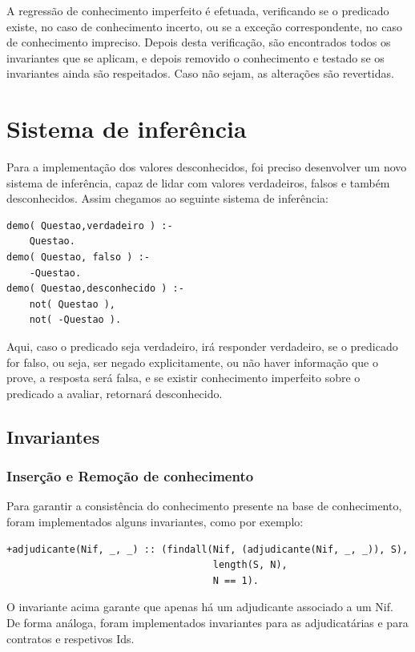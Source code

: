 \documentclass[a4paper]{report}
\begin{document}
A regressão de conhecimento imperfeito é efetuada, verificando se o predicado
existe, no caso de conhecimento incerto, ou se a exceção correspondente, no caso
de conhecimento impreciso. Depois desta verificação, são encontrados todos os
invariantes que se aplicam, e depois removido o conhecimento e testado se os
invariantes ainda são respeitados. Caso não sejam, as alterações são revertidas.

\chapter{Sistema de inferência}

Para a implementação dos valores desconhecidos, foi preciso desenvolver um novo
sistema de inferência, capaz de lidar com valores verdadeiros, falsos e também
desconhecidos. Assim chegamos ao seguinte sistema de inferência: 

\begin{verbatim}
demo( Questao,verdadeiro ) :-
    Questao.
demo( Questao, falso ) :-
    -Questao.
demo( Questao,desconhecido ) :-
    not( Questao ),
    not( -Questao ).
\end{verbatim}

Aqui, caso o predicado seja verdadeiro, irá responder verdadeiro, se o predicado
for falso, ou seja, ser negado explicitamente, ou não haver informação que o
prove, a resposta será falsa, e se existir conhecimento imperfeito sobre o
predicado a avaliar, retornará desconhecido.

\section{Invariantes}

\subsection{Inserção e Remoção de conhecimento}

Para garantir a consistência do conhecimento presente na base de conhecimento,
foram implementados alguns invariantes, como por exemplo:

\begin{verbatim}
+adjudicante(Nif, _, _) :: (findall(Nif, (adjudicante(Nif, _, _)), S),
                                    length(S, N),
                                    N == 1).
\end{verbatim}

O invariante acima garante que apenas há um adjudicante associado a um Nif. De
forma análoga, foram implementados invariantes para as adjudicatárias e para
contratos e respetivos Ids.
\end{document}
